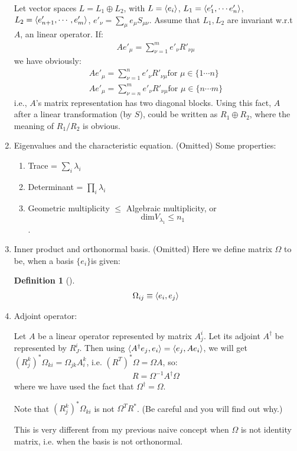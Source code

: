 \documentclass{article}
\numberwithin{equation}{subsection} %
\newtheorem{defi}{Definition}[section]
\theoremstyle{definition}
\begin{document}
\begin{enumerate}
        Let vector spaces $L=L_1\oplus L_2$, with $L=\braket{e_i}$,
        $L_1=\braket{e'_1,\cdots e'_n}$,$L_2=\braket{e'_{n+1},\cdots,e'_m}$,
        $e'_\nu=\sum_\mu e_\mu  S_{\mu\nu}$. 
        Assume that $L_1,L_2$ are invariant w.r.t $A$, an linear operator. If:
        \begin{align}
            A e'_\mu = \sum_{\nu=1}^{m} e'_\nu R'_{\nu\mu}
        \end{align}
        we have obviously:
        \begin{align}
            A e'_\mu = \sum_{\nu=1}^{n} e'_\nu R'_{\nu\mu} \text{for }
                \mu\in \{1\cdots n\}
                \\
            A e'_\mu = \sum_{\nu=n}^{m} e'_\nu R'_{\nu\mu} \text{for }
                \mu\in \{n\cdots m\}
        \end{align}
        i.e., $A$'s matrix representation has two diagonal blocks.
        Using this fact, $A$ after a linear transformation (by $S$),
        could be written as $R_1\oplus R_2$, where the meaning of $R_1/R_2$
        is obvious.
    \item Eigenvalues and the characteristic equation. (Omitted)
        Some properties:
        \begin{enumerate}
            \item Trace = $\sum_i \lambda_i$
            \item Determinant = $\prod_i \lambda_i$
            \item Geometric multiplicity $\leq$ Algebraic multiplicity, or
                $$\mathrm{dim}V_{\lambda_1} \leq n_1$$.
        \end{enumerate}
    \item Inner product and orthonormal basis. (Omitted) Here we define
        matrix $\Omega$ to be, when a basis $\{e_i\}$is given:
        \begin{defi}[]
            \begin{align}
                \Omega_{ij} \equiv \braket{e_i,e_j}
            \end{align}
        \end{defi}
    \item Adjoint operator:

        Let $A$ be a linear operator represented by matrix $A^i_j$. Let
        its adjoint $A^\dagger$ be represented by $R^i_J$. Then using
        $\braket{A^\dagger e_j, e_i} = \braket{e_j,A e_i}$, we will
        get $(R^{k}_j)^* \Omega_{ki}= \Omega_{jk}A^k_i$, i.e.
        $(R^T)^* \Omega = \Omega A$, so:
        \begin{align}
            R = \Omega^{-1} A^\dagger \Omega
        \end{align}
        where we have used the fact that $\Omega^\dagger=\Omega$.

        Note that $(R^{k}_j)^* \Omega_{ki}$ is not $\Omega^T R^*$.
        (Be careful and you will find out why.)

        This is very different from my previous naive concept
        when $\Omega$ is not identity matrix, i.e. when the basis
        is not orthonormal.
\end{enumerate}
\end{document}
